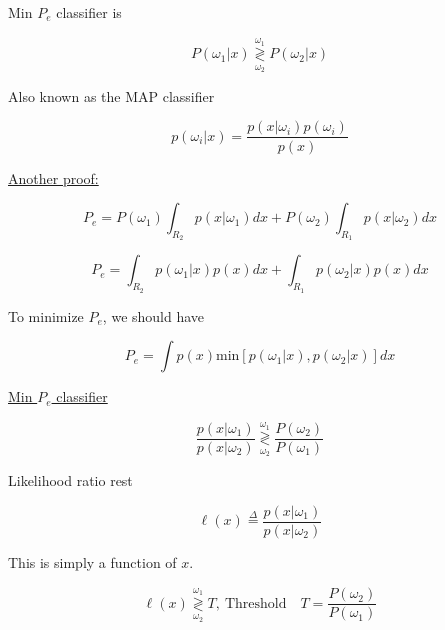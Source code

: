 \documentclass[fleqn]{article}
\newcommand{\decisionbound}{\overset{\omega_1}{\underset{\omega_2}{\gtrless}}}
\begin{document}
	Min $P_e$ classifier is
	
	\begin{equation*}
		P(\omega_1|x) \decisionbound P(\omega_2|x)
	\end{equation*}
		
	Also known as the MAP classifier
	
	\begin{equation*}
		p(\omega_i|x) = \frac{p(x|\omega_i)p(\omega_i)}{p(x)}
	\end{equation*}
	
	\underline{Another proof:}
	
	\begin{equation*}
		P_e = P(\omega_1)\int_{R_2}{p(x|\omega_1)dx} + P(\omega_2)\int_{R_1}{p(x|\omega_2)dx}
	\end{equation*}
	
	\begin{equation*}
		P_e = \int_{R_2}{p(\omega_1|x)p(x)dx} + \int_{R_1}{p(\omega_2|x)p(x)dx}
	\end{equation*}
	
	To minimize $P_e$, we should have
	
	\begin{equation*}
		P_e = \int{p(x)\text{min}\left[p(\omega_1|x), p(\omega_2|x)\right]}dx
	\end{equation*}
	
	\underline{Min $P_e$ classifier}
	
	\begin{equation*}
		\frac{p(x|\omega_1)}{p(x|\omega_2)} \decisionbound \frac{P(\omega_2)}{P(\omega_1)}
	\end{equation*}
	
	Likelihood ratio rest
	
	\begin{equation*}
		\ell(x) \overset{\Delta}{=} \frac{p(x|\omega_1)}{p(x|\omega_2)}
	\end{equation*}
	
	This is simply a function of $x$.
	
	\begin{equation*}
		\ell(x) \decisionbound T,\ \text{Threshold}\quad T = \frac{P(\omega_2)}{P(\omega_1)}
	\end{equation*}
\end{document}
